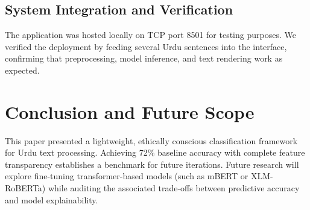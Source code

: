 \documentclass[11pt,a4paper]{article}
\begin{document}
\subsection{System Integration and Verification}
The application was hosted locally on TCP port 8501 for testing purposes. We verified the deployment by feeding several Urdu sentences into the interface, confirming that preprocessing, model inference, and text rendering work as expected.

\section{Conclusion and Future Scope}
This paper presented a lightweight, ethically conscious classification framework for Urdu text processing. Achieving 72\% baseline accuracy with complete feature transparency establishes a benchmark for future iterations. Future research will explore fine-tuning transformer-based models (such as mBERT or XLM-RoBERTa) while auditing the associated trade-offs between predictive accuracy and model explainability.
\end{document}
